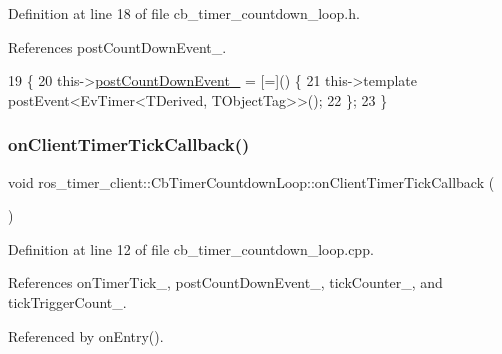 Definition at line 18 of file cb\+\_\+timer\+\_\+countdown\+\_\+loop.\+h.



References post\+Count\+Down\+Event\+\_\+.


\begin{DoxyCode}
19     \{
20         this->\hyperlink{classros__timer__client_1_1CbTimerCountdownLoop_a4ed7025f6f2d7222fe6471a901f134db}{postCountDownEvent\_} = [=]() \{
21             this->\textcolor{keyword}{template} postEvent<EvTimer<TDerived, TObjectTag>>();
22         \};
23     \}
\end{DoxyCode}
\mbox{\label{classros__timer__client_1_1CbTimerCountdownLoop_a8b3cbf593a9d3823cd1f56611fb0a0b3}} 
\subsubsection{\texorpdfstring{on\+Client\+Timer\+Tick\+Callback()}{onClientTimerTickCallback()}}
{\footnotesize\ttfamily void ros\+\_\+timer\+\_\+client\+::\+Cb\+Timer\+Countdown\+Loop\+::on\+Client\+Timer\+Tick\+Callback (\begin{DoxyParamCaption}{ }\end{DoxyParamCaption})\hspace{0.3cm}{\ttfamily [private]}}



Definition at line 12 of file cb\+\_\+timer\+\_\+countdown\+\_\+loop.\+cpp.



References on\+Timer\+Tick\+\_\+, post\+Count\+Down\+Event\+\_\+, tick\+Counter\+\_\+, and tick\+Trigger\+Count\+\_\+.



Referenced by on\+Entry().


